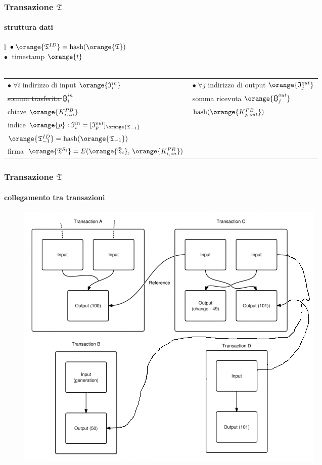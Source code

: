 \begin{frame}
	\frametitle{Transazione $\mathfrak{T}$}
	\framesubtitle{struttura dati}
	
	\begin{table}
	  \centering
	  \begin{tabular}{l}
	    $\bullet\;\orange{\mathfrak{T}^{ID}}=\text{hash}(\mathfrak{\orange{T}})$\\
	    $\bullet\;$ timestamp $\orange{t}$ \\ \\
	    \begin{tabular}{l|l}
			$\bullet\;\forall i$ indirizzo di {\color{blue}input}  $\orange{\mathfrak{I}_i^{in}}$ & 
			$\bullet\;\forall j$ indirizzo di {\color{blue}output} $\orange{\mathfrak{I}_j^{out}}$ \\
			\tabitem \sout{somma trasferita $\bitcoinA_i^{in}$} & \tabitem somma ricevuta $\orange{\bitcoinA_j^{out}}$ \\
			\tabitem chiave $\orange{K^{PB}_{i,\,in}}$ & \tabitem $\text{hash}(\orange{K^{PB}_{j,\,out}})$ \\
			\tabitem indice $\orange{p}: \mathfrak{I}_i^{in}=[\mathfrak{I}_p^{out}]_{\orange{\mathfrak{T}_{-1}}}$ \\
			\tabitem $\orange{\mathfrak{T}^{ID}_{-1}}=\text{hash}(\orange{\mathfrak{T}_{-1}})$ \\
			\tabitem firma
			$\orange{\mathfrak{T}^{S_i}}=E(\orange{\tilde{\mathfrak{T}}_i},\,\orange{K^{PR}_{i,\,in}})$
		\end{tabular}		
	  \end{tabular}
	\end{table}

\end{frame}

\begin{frame}
	\frametitle{Transazione $\mathfrak{T}$}
	\framesubtitle{collegamento tra transazioni}

	\begin{figure}[H]
		\begin{center}
			\includegraphics[height = 7 cm]{images/ref.png}	
		\end{center}
	\end{figure}

\end{frame}